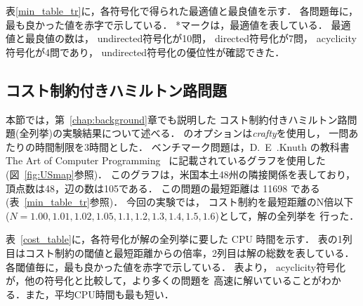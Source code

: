 表\ref{min_table_tr}に，各符号化で得られた最適値と最良値を示す．
各問題毎に，最も良かった値を赤字で示している．
*マークは，最適値を表している．
最適値と最良値の数は，
\textsf{undirected}符号化が10問，
\textsf{directed}符号化が7問，
\textsf{acyclicity}符号化が4問であり，
\textsf{undirected}符号化の優位性が確認できた．


\subsection{コスト制約付きハミルトン路問題}


本節では，第~\ref{chap:background}章でも説明した
コスト制約付きハミルトン路問題(全列挙)の実験結果について述べる．
{\clingo}のオプションは\textit{crafty}を使用し，
一問あたりの時間制限を3時間とした．
ベンチマーク問題は，D.~E~.Knuth の教科書
The Art of Computer Programming~\cite{Knuth:TAOCP:SAT}
に記載されているグラフを使用した(図~\ref{fig:USmap}参照)．
このグラフは，米国本土48州の隣接関係を表しており，
頂点数は48，辺の数は105である．
この問題の最短距離は 11698 である(表~\ref{min_table_tr}参照)．
今回の実験では，
コスト制約を最短距離のN倍以下
($N=1.00,1.01,1.02,1.05,1.1,1.2,1.3,1.4,1.5,1.6$)として，解の全列挙を
行った．

表~\ref{cost_table}に，各符号化が解の全列挙に要した CPU 時間を示す．
表の1列目はコスト制約の閾値と最短距離からの倍率，2列目は解の総数を表している．
各閾値毎に，最も良かった値を赤字で示している．
表より，
\textsf{acyclicity}符号化が，他の符号化と比較して，より多くの問題を
高速に解いていることがわかる．また，平均CPU時間も最も短い．

